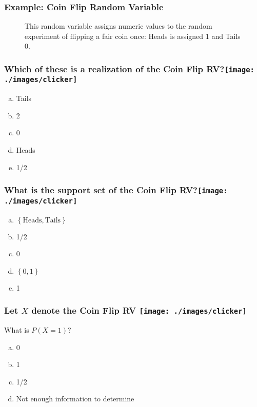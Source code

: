 \begin{frame}
\frametitle{Example: Coin Flip Random Variable}

\begin{figure}
\centering
{}
\caption{This random variable assigns numeric values to the random experiment of flipping a fair coin once: Heads is assigned 1 and Tails 0.}
\end{figure}
\end{frame}
\begin{frame}
  \frametitle{Which of these is a realization of the Coin Flip RV?\hfill\texttt{[image: ./images/clicker]}}
  \begin{enumerate}[(a)]
    \item Tails
    \item 2
    \item 0 
    \item Heads
    \item 1/2
  \end{enumerate}
\end{frame}
\begin{frame}
  \frametitle{What is the support set of the Coin Flip RV?\hfill\texttt{[image: ./images/clicker]}}
  \begin{enumerate}[(a)]
    \item $\left\{ \mbox{Heads}, \mbox{Tails} \right\}$ 
    \item 1/2 
    \item 0 
    \item $\left\{ 0,1 \right\}$
    \item 1
  \end{enumerate}
\end{frame}
\begin{frame}
  \frametitle{Let $X$ denote the Coin Flip RV \hfill\texttt{[image: ./images/clicker]}}
  What is $P\left( X=1 \right)$?

  \vspace{1em}

  \begin{enumerate}[(a)]
    \item 0 
    \item 1  
    \item 1/2 
    \item Not enough information to determine
  \end{enumerate}
\end{frame}
